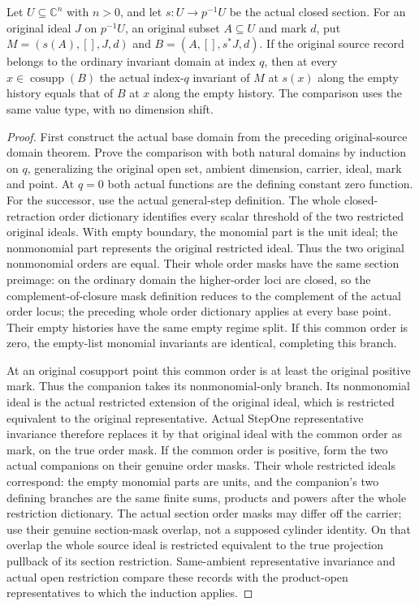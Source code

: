 \begin{theorem}
\label{hir:actual-closed-section-all-index-initial-values}
\leanok
Let $U\subseteq\mathbb C^n$ with $n>0$, and let $s:U\to p^{-1}U$ be the actual
closed section. For an original ideal $J$ on $p^{-1}U$, an original subset
$A\subseteq U$ and mark $d$, put $M=(s(A),[],J,d)$ and
$B=(A,[],s^*J,d)$. If the original source record belongs to the ordinary invariant
domain at index $q$, then at every $x\in\operatorname{cosupp}(B)$ the actual index-$q$ invariant of
$M$ at $s(x)$ along the empty history equals that of $B$ at $x$ along the empty
history. The comparison uses the same value type, with no dimension shift.
\end{theorem}
\begin{proof}
First construct the actual base domain from the preceding original-source
domain theorem. Prove the comparison with both natural domains by induction
on $q$, generalizing the original open set, ambient dimension, carrier,
ideal, mark and point. At $q=0$ both actual functions are the defining constant
zero function. For the successor, use the actual general-step definition.
The whole closed-retraction order dictionary identifies every scalar threshold
of the two restricted original ideals. With empty boundary, the monomial part
is the unit ideal; the nonmonomial part represents the original restricted
ideal. Thus the two original nonmonomial orders are equal. Their whole order masks have the same section preimage: on the ordinary
domain the higher-order loci are closed, so the complement-of-closure mask
definition reduces to the complement of the actual order locus; the preceding
whole order dictionary applies at every base point. Their empty histories
have the same empty regime split. If this common order is zero, the empty-list
monomial invariants are identical, completing this branch.

At an original cosupport point this common order is at least the original
positive mark. Thus the companion takes its nonmonomial-only branch. Its
nonmonomial ideal is the actual restricted extension of the original ideal,
which is restricted equivalent to the original representative. Actual StepOne
representative invariance therefore replaces it by that original ideal with
the common order as mark, on the true order mask. If the common order is positive, form the two actual companions on their genuine
order masks. Their whole restricted ideals correspond: the empty monomial parts
are units, and the companion's two defining branches are the same finite sums,
products and powers after the whole restriction dictionary. The actual section
order masks may differ off the carrier; use their genuine section-mask overlap,
not a supposed cylinder identity. On that overlap the whole source ideal is
restricted equivalent to the true projection pullback of its section restriction.
Same-ambient representative invariance and actual open restriction compare these
records with the product-open representatives to which the induction applies.


\end{proof}
